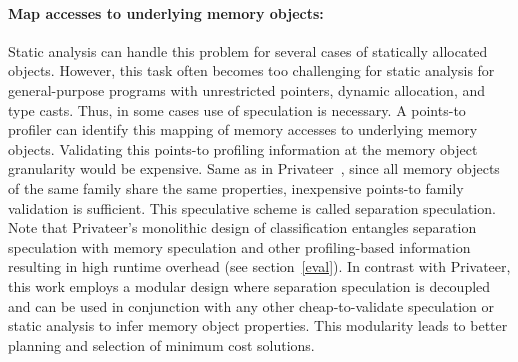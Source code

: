 \paragraph{Map accesses to underlying memory objects:}
%
Static analysis can handle this problem for several cases of statically
allocated objects.
%
However, this task often becomes too challenging for static analysis for
general-purpose programs with unrestricted pointers, dynamic allocation, and
type casts.
%
%
Thus, in some cases use of speculation is necessary.
%
A points-to profiler can identify this mapping of memory accesses to underlying
memory objects.
%
Validating this points-to profiling information at the memory object granularity
would be expensive.
%
%
%
Same as in Privateer~\cite{johnson:pldi:12}, since all memory objects of the
same family share the same properties, inexpensive points-to family validation
is sufficient.
%
%
%
This speculative scheme is called separation speculation.
%
Note that Privateer's monolithic design of classification entangles separation
speculation with memory speculation and other profiling-based information
resulting in high runtime overhead (see section~\ref{eval}).
%
In contrast with Privateer, this work employs a modular design where separation
speculation is decoupled and can be used in conjunction with any other
cheap-to-validate speculation or static analysis to infer memory object
properties. This modularity leads to better planning and selection of minimum
cost solutions.


